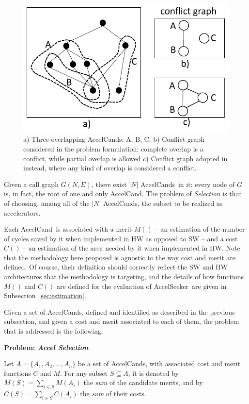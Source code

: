 \documentclass[]{usiinfthesis}
\newcommand{\aseeker}{{AccelSeeker}}
\newcommand{\candidate}{{AccelCand}}
\newcommand{\candidates}{{AccelCand}s}
\newcommand{\asprobname}{\emph{Accel Selection}}
\begin{document}
\begin{figure}[!t]
  \centering
  \includegraphics[width=.5\linewidth]{figs/overlap_examples.pdf}
  \caption{a) Three overlapping \candidates: A, B, C. b)
          Conflict graph considered in the problem formulation:
          complete overlap is a conflict, while partial overlap is
          allowed c) Conflict graph adopted in
          \cite{ZacharopoulosApr19} instead, where any kind of overlap
          is considered a conflict. 
}
  \label{fig:overlap-examples}
\end{figure}

Given a call graph $G(N,E)$, there exist $|N|$ \candidates\ in it;
every node of $G$ is, in fact, the root of one and only \candidate.
The problem of \emph{Selection} is that of choosing, among all of the
$|N|$ \candidates, the subset to be realized as accelerators.\par

Each \candidate\ is associated with a merit $M()$ -- an estimation of the
number of cycles saved by it when implemented in HW as opposed to SW --
and a cost $C()$ --  an estimation of the area needed by it when
implemented in HW. Note that the methodology here proposed is agnostic to
the way cost and merit are defined.
Of course, their definition should correctly reflect the SW and HW
architectures that the methodology is targeting, and the details of
how functions $M()$ and $C()$ are defined for the evaluation
of \aseeker\ are given in Subsection~\ref{sec:estimation}.\par

Given a set of \candidates, defined and identified as described
in the previous subsection, and given a cost and merit associated to
each of them, the problem that is addressed is the following.\par

\textbf{Problem: \asprobname}

Let $A = \{ A_1, A_2, \ldots, A_n \}$ be a set of
\candidates, with associated cost and merit functions $C$ and $M$.
For any subset $S\subseteq A$, it is denoted by $M(S) = \sum_{i\in S} M(A_i)$ the 
\emph{sum} of the candidate merits, and by $C(S) = \sum_{i\in S} 
C(A_i)$ the \emph{sum} of their costs.\par
\end{document}
